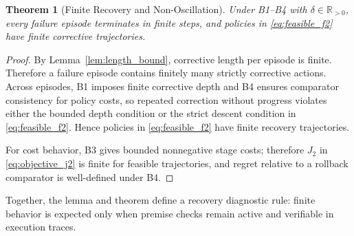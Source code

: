 \documentclass{article} %
\newtheorem{theorem}{Theorem}[section]
\begin{document}
\begin{theorem}[Finite Recovery and Non-Oscillation]
\label{thm:bounded_recovery}
Under B1--B4 with $\delta\in\mathbb{R}_{>0}$, every failure episode terminates in finite steps, and policies in \eqref{eq:feasible_f2} have finite corrective trajectories.
\end{theorem}
\begin{proof}
By Lemma~\ref{lem:length_bound}, corrective length per episode is finite. Therefore a failure episode contains finitely many strictly corrective actions. Across episodes, B1 imposes finite corrective depth and B4 ensures comparator consistency for policy costs, so repeated correction without progress violates either the bounded depth condition or the strict descent condition in \eqref{eq:feasible_f2}. Hence policies in \eqref{eq:feasible_f2} have finite recovery trajectories.

For cost behavior, B3 gives bounded nonnegative stage costs; therefore $J_2$ in \eqref{eq:objective_j2} is finite for feasible trajectories, and regret relative to a rollback comparator is well-defined under B4.\qedhere
\end{proof}
Together, the lemma and theorem define a recovery diagnostic rule: finite behavior is expected only when premise checks remain active and verifiable in execution traces.
\end{document}
